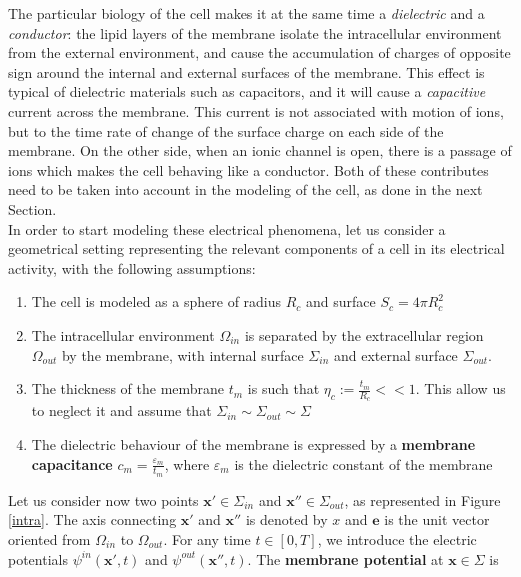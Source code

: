 \documentclass[12pt, a4paper]{report}
\begin{document}
The particular biology of the cell makes it at the same time a \textit{dielectric} and a \textit{conductor}: the lipid layers of the membrane isolate the intracellular environment from the external environment, and cause the accumulation of charges of opposite sign around the internal and external surfaces of the membrane. This effect is typical of dielectric materials such as capacitors, and it will cause a \textit{capacitive} current across the membrane. This current is not associated with motion of ions, but to the time rate of change of the surface charge on each side of the membrane. On the other side, when an ionic channel is open, there is a passage of ions which makes the cell behaving like a conductor. Both of these contributes need to be taken into account in the modeling of the cell, as done in the next Section.
\\

In order to start modeling these electrical phenomena, let us consider a geometrical setting representing the relevant components of a cell in its electrical activity, with the following assumptions:

\begin{enumerate}
	
	\item The cell is modeled as a sphere of radius $R_c$ and surface $ S_c = 4\pi R_c^2$
	
	\item The intracellular environment $\Omega_{in}$ is separated by the extracellular region $\Omega_{out}$ by the membrane, with internal surface $\Sigma_{in}$ and external surface $\Sigma_{out}$.%
	
	\item The thickness of the membrane $t_m$ is such that $ \eta_c := \frac{t_m}{R_c} << 1$. This allow us to neglect it and assume that $\Sigma_{in} \sim \Sigma_{out} \sim \Sigma$ \label{ass 3}
	
	\item The dielectric behaviour of the membrane is expressed by a \textbf{membrane capacitance}  $ c_m = \frac{\varepsilon_m}{t_m} $, where $\varepsilon_m$ is the dielectric constant of the membrane \label{ass 4}
	
\end{enumerate}

Let us consider now two points $ \textbf{x}' \in \Sigma_{in}$ and $ \textbf{x}'' \in \Sigma_{out}$, as represented in Figure \ref{intra}. The axis connecting $ \textbf{x}'$ and $ \textbf{x}''$ is denoted by $x$ and $\textbf{e}$ is the unit vector oriented from $\Omega_{in}$ to $\Omega_{out}$. For any time $ t \in [0,T]$, we introduce the electric potentials $ \psi^{in} (\textbf{x}',t) $ and  $ \psi^{out} (\textbf{x}'',t) $. The \textbf{membrane potential} at $ \textbf{x} \in \Sigma$ is 
\end{document}
